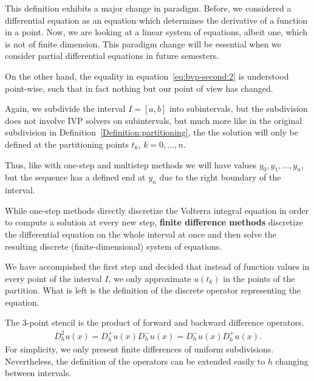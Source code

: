 

\begin{remark}
  This definition exhibits a major change in paradigm. Before, we
  considered a differential equation as an equation which determines
  the derivative of a function in a point. Now, we are looking at a
  linear system of equations, albeit one, which is not of finite
  dimension. This paradigm change will be essential when we consider
  partial differential equations in future semesters.
  
  On the other hand, the equality in equation~\eqref{eq:bvp-second:2}
  is understood point-wise, such that in fact nothing but our point of
  view has changed.
\end{remark}

\begin{intro}
  Again, we subdivide the interval $I= [a,b]$ into subintervals, but
  the subdivision does not involve IVP solvers on subintervals, but
  much more like in the original subdivision in
  Definition~\ref{Definition:partitioning}, the the solution will only
  be defined at the partitioning points $t_k$, $k=0,\dots,n$.
  
  Thus, like with one-step and multistep methods we will have values
  $y_0, y_1,\dots, y_n$, but the sequence has a defined end at $y_n$
  due to the right boundary of the interval.

  While one-step methods directly discretize the Volterra integral
  equation in order to compute a solution at every new step,
  \textbf{finite difference methods} discretize the differential
  equation on the whole interval at once and then solve the resulting
  discrete (finite-dimensional) system of equations.

  We have accompished the first step and decided that instead of
  function values in every point of the interval $I$, we only
  approximate $u(t_k)$ in the points of the partition. What is left is
  the definition of the discrete operator representing the equation.
\end{intro}



\begin{remark}
  The 3-point stencil is the product of forward and backward
  difference operators.
  \begin{gather*}
    D^2_h u(x) = D^+_hu(x)D^-_hu(x) = D^-_hu(x)D^+_hu(x).
  \end{gather*}
  For simplicity, we only present finite differences of uniform
  subdivisions. Nevertheless, the definition of the operators can be
  extended easily to $h$ changing between intervals.
\end{remark}

